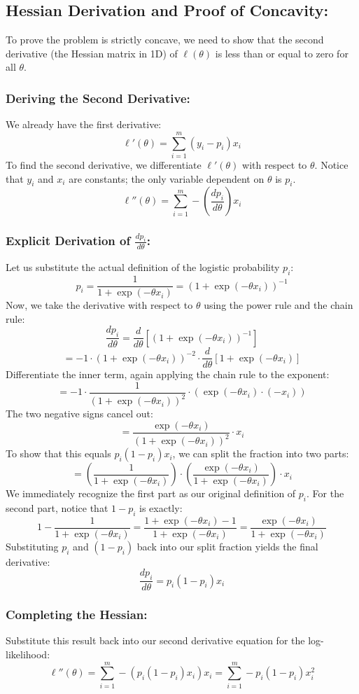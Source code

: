 \documentclass[twoside, 10pt]{article}
\begin{document}
\subsection{Hessian Derivation and Proof of Concavity:}
To prove the problem is strictly concave, we need to show that the second derivative (the Hessian matrix in 1D) of $\ell(\theta)$ is less than or equal to zero for all $\theta$.
\subsubsection{Deriving the Second Derivative:}
We already have the first derivative:
\[
\ell'(\theta) = \sum_{i=1}^m (y_i - p_i) x_i
\]
To find the second derivative, we differentiate $\ell'(\theta)$ with respect to $\theta$. Notice that $y_i$ and $x_i$ are constants; the only variable dependent on $\theta$ is $p_i$.
\[
\ell''(\theta) = \sum_{i=1}^m - \left( \frac{dp_i}{d\theta} \right) x_i
\]
\subsubsection{Explicit Derivation of $\frac{dp_i}{d\theta}$:}
Let us substitute the actual definition of the logistic probability $p_i$:
\[
p_i = \frac{1}{1 + \exp(-\theta x_i)} = (1 + \exp(-\theta x_i))^{-1}
\]
Now, we take the derivative with respect to $\theta$ using the power rule and the chain rule:
\[
\frac{dp_i}{d\theta} = \frac{d}{d\theta} \left[ (1 + \exp(-\theta x_i))^{-1} \right]
\]
\[
= -1 \cdot (1 + \exp(-\theta x_i))^{-2} \cdot \frac{d}{d\theta} \left[ 1 + \exp(-\theta x_i) \right]
\]
Differentiate the inner term, again applying the chain rule to the exponent:
\[
= -1 \cdot \frac{1}{(1 + \exp(-\theta x_i))^2} \cdot \left( \exp(-\theta x_i) \cdot (-x_i) \right)
\]
The two negative signs cancel out:
\[
= \frac{\exp(-\theta x_i)}{(1 + \exp(-\theta x_i))^2} \cdot x_i
\]
To show that this equals $p_i(1 - p_i)x_i$, we can split the fraction into two parts:
\[
= \left( \frac{1}{1 + \exp(-\theta x_i)} \right) \cdot \left( \frac{\exp(-\theta x_i)}{1 + \exp(-\theta x_i)} \right) \cdot x_i
\]
We immediately recognize the first part as our original definition of $p_i$. For the second part, notice that $1 - p_i$ is exactly:
\[
1 - \frac{1}{1 + \exp(-\theta x_i)} = \frac{1 + \exp(-\theta x_i) - 1}{1 + \exp(-\theta x_i)} = \frac{\exp(-\theta x_i)}{1 + \exp(-\theta x_i)}
\]
Substituting $p_i$ and $(1 - p_i)$ back into our split fraction yields the final derivative:
\[
\frac{dp_i}{d\theta} = p_i (1 - p_i) x_i
\]
\subsubsection{Completing the Hessian:}
Substitute this result back into our second derivative equation for the log-likelihood:
\[
\ell''(\theta) = \sum_{i=1}^m - \left( p_i(1 - p_i) x_i \right) x_i = \sum_{i=1}^m - p_i(1 - p_i) x_i^2
\]
\end{document}
